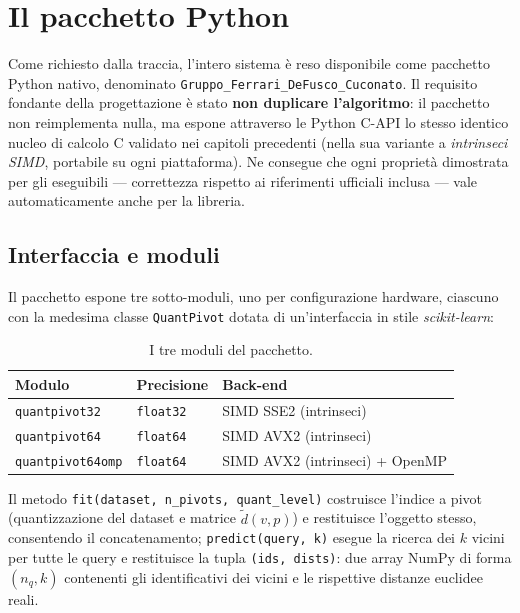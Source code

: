 \maketitle
\chapter{Il pacchetto Python}

Come richiesto dalla traccia, l'intero sistema è reso disponibile come pacchetto Python nativo, denominato \texttt{Gruppo\_Ferrari\_DeFusco\_Cuconato}. Il requisito fondante della progettazione è stato \textbf{non duplicare l'algoritmo}: il pacchetto non reimplementa nulla, ma espone attraverso le Python C-API lo stesso identico nucleo di calcolo C validato nei capitoli precedenti (nella sua variante a \emph{intrinseci SIMD}, portabile su ogni piattaforma). Ne consegue che ogni proprietà dimostrata per gli eseguibili — correttezza rispetto ai riferimenti ufficiali inclusa — vale automaticamente anche per la libreria.

\section{Interfaccia e moduli}
Il pacchetto espone tre sotto-moduli, uno per configurazione hardware, ciascuno con la medesima classe \texttt{QuantPivot} dotata di un'interfaccia in stile \emph{scikit-learn}:

\begin{table}[h!]
\centering
\small
\renewcommand{\arraystretch}{1.4}
\begin{tabularx}{\textwidth}{|l|l|X|}
\hline
\textbf{Modulo} & \textbf{Precisione} & \textbf{Back-end} \\ \hline
\texttt{quantpivot32}    & \texttt{float32} & SIMD SSE2 (intrinseci) \\ \hline
\texttt{quantpivot64}    & \texttt{float64} & SIMD AVX2 (intrinseci) \\ \hline
\texttt{quantpivot64omp} & \texttt{float64} & SIMD AVX2 (intrinseci) + OpenMP \\ \hline
\end{tabularx}
\caption{I tre moduli del pacchetto.}
\end{table}

Il metodo \texttt{fit(dataset, n\_pivots, quant\_level)} costruisce l'indice a pivot (quantizzazione del dataset e matrice $\tilde{d}(v,p)$) e restituisce l'oggetto stesso, consentendo il concatenamento; \texttt{predict(query, k)} esegue la ricerca dei $k$ vicini per tutte le query e restituisce la tupla \texttt{(ids, dists)}: due array NumPy di forma $(n_q, k)$ contenenti gli identificativi dei vicini e le rispettive distanze euclidee reali.

